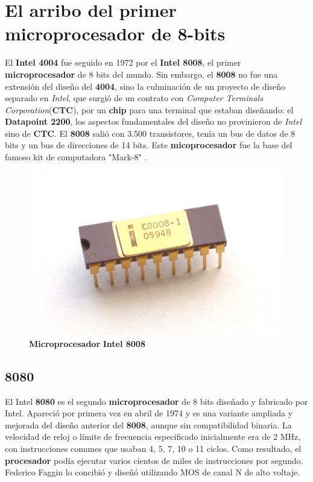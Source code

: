 \section{El arribo del primer \textbf{microprocesador} de 8-bits}
El \textbf{Intel 4004} fue seguido en 1972 por el \textbf{Intel 8008}, el primer \textbf{microprocesador} de 8 bits del mundo.
Sin embargo, el \textbf{8008} no fue una extensión del diseño del \textbf{4004}, sino la culminación de un proyecto de diseño separado
en \emph{Intel}, que surgió de un contrato con \emph{Computer Terminals Corporation}(\textbf{CTC}), por un \textbf{chip} para
una terminal que estaban diseñando: el \textbf{Datapoint 2200}, los aspectos fundamentales del diseño no provinieron de \emph{Intel}
sino de \textbf{CTC}. El \textbf{8008} salió con 3.500 transistores, tenía un bus de datos de 8 bits y un bus de direcciones de 14 bits. Este
\textbf{micoprocesador} fue la base del famoso kit de computadora "Mark-8" .

\begin{figure}[htb]
	\centering
	\includegraphics[scale = 0.15]{Graphics/Intel_C8008-1.jpg}
	\caption{\textbf{Microprocesador}  \textbf{Intel 8008}}
	\label{fig:13}
\end{figure}

\subsection{\textbf{8080}}
El Intel \textbf{8080} es el segundo \textbf{microprocesador} de 8 bits diseñado y fabricado por Intel. Apareció por primera vez en abril de
1974 y es una variante ampliada y mejorada del diseño anterior del \textbf{8008}, aunque sin compatibilidad binaria. La velocidad de reloj o
límite de frecuencia especificado inicialmente era de 2 MHz, con instrucciones comunes que usaban 4, 5, 7, 10 o 11 ciclos. Como resultado,
el \textbf{procesador} podía ejecutar varios cientos de miles de instrucciones por segundo. Federico Faggin lo concibió y diseñó utilizando MOS de
canal N de alto voltaje.

